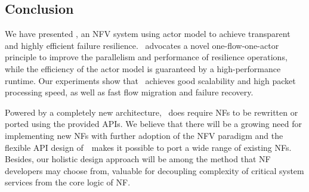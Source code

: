 \subsection{Conclusion}

We have presented \nfactor, an NFV system using actor model to achieve transparent and highly efficient failure resilience. \nfactor~advocates a novel one-flow-one-actor principle to improve the parallelism and performance of resilience operations, while the efficiency of the actor model is guaranteed by a high-performance runtime. Our experiments show that \nfactor~achieves good scalability and high packet processing speed, as well as fast flow migration and failure recovery.

Powered by a completely new architecture, \nfactor~does require NFs to be rewritten or ported using the provided APIs. We believe that there will be a growing need for implementing new NFs with further adoption of the NFV paradigm and the flexible API design of~\nfactor~makes it possible to port a wide range of existing NFs. Besides, our holistic design approach will be among the method that NF developers may choose from, valuable for decoupling complexity of critical system services from the core logic of NF. %


